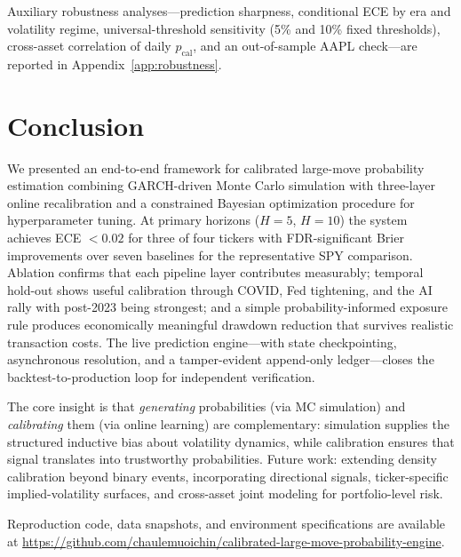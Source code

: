 \documentclass[11pt,a4paper]{article}
\newcommand{\pcal}{p_{\text{cal}}}
\begin{document}
Auxiliary robustness analyses---prediction sharpness, conditional ECE by era and volatility regime, universal-threshold sensitivity (5\% and 10\% fixed thresholds), cross-asset correlation of daily $\pcal$, and an out-of-sample AAPL check---are reported in Appendix~\ref{app:robustness}.

\section{Conclusion}
\label{sec:conclusion}

We presented an end-to-end framework for calibrated large-move probability estimation combining GARCH-driven Monte Carlo simulation with three-layer online recalibration and a constrained Bayesian optimization procedure for hyperparameter tuning. At primary horizons ($H\!=\!5$, $H\!=\!10$) the system achieves ECE $< 0.02$ for three of four tickers with FDR-significant Brier improvements over seven baselines for the representative SPY comparison. Ablation confirms that each pipeline layer contributes measurably; temporal hold-out shows useful calibration through COVID, Fed tightening, and the AI rally with post-2023 being strongest; and a simple probability-informed exposure rule produces economically meaningful drawdown reduction that survives realistic transaction costs. The live prediction engine---with state checkpointing, asynchronous resolution, and a tamper-evident append-only ledger---closes the backtest-to-production loop for independent verification.

The core insight is that \emph{generating} probabilities (via MC simulation) and \emph{calibrating} them (via online learning) are complementary: simulation supplies the structured inductive bias about volatility dynamics, while calibration ensures that signal translates into trustworthy probabilities. Future work: extending density calibration beyond binary events, incorporating directional signals, ticker-specific implied-volatility surfaces, and cross-asset joint modeling for portfolio-level risk.

Reproduction code, data snapshots, and environment specifications are available at \url{https://github.com/chaulemuoichin/calibrated-large-move-probability-engine}.

\appendix
\end{document}
